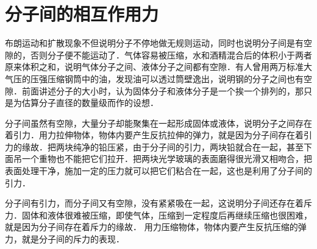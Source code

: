 \section{分子间的相互作用力}
布朗运动和扩散现象不但说明分子不停地做无规则运动，同时也说明分子间是有空隙的，否则分子便不能运动了．气体容易被压缩，水和酒精混合后的体积小于两者原来体积之和，说明气体分子之间、液体分子之间都有空隙．有人曾用两万标准大气压的压强压缩钢筒中的油，发现油可以透过筒壁逸出，说明钢的分子之间也有空隙．前面讲述分子的大小时，认为固体分子和液体分子是一个挨一个排列的，那只是为估算分子直径的数量级而作的设想．

分子间虽然有空隙，大量分子却能聚集在一起形成固体或液体，说明分子之间存在着引力．用力拉伸物体，物体内要产生反抗拉伸的弹力，就是因为分子间存在着引力的缘故．把两块纯净的铅压紧，由于分子间的引力，两块铅就合在一起，甚至下面吊一个重物也不能把它们拉开．把两块光学玻璃的表面磨得很光滑又相吻合，把表面处理干净，施加一定的压力就可以把它们粘合在一起，这也是利用了分子间的引力．

分子间有引力，而分子间又有空隙，没有紧紧吸在一起，这说明分子间还存在着斥力．固体和液体很难被压缩，即使气体，压缩到一定程度后再继续压缩也很困难，就是因为分子间存在着斥力的缘故．
用力压缩物体，物体内要产生反抗压缩的弹力，就是分子间的斥力的表现．

